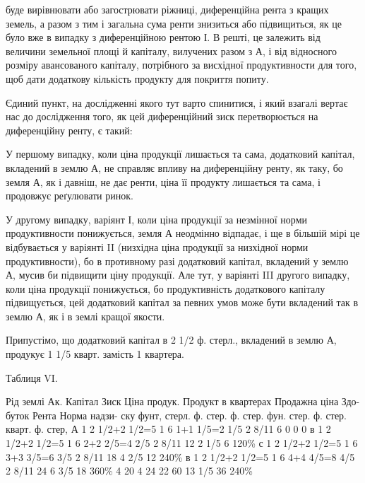 \parcont{}  %
буде вирівнювати або загострювати ріжниці, диференційна рента з кращих земель,
а разом з тим і загальна сума ренти знизиться або підвищиться, як це було
вже в випадку з диференційною рентою І. В решті, це залежить від величини земельної
площі й капіталу, вилучених разом з А, і від відносного розміру авансованого
капіталу, потрібного за висхідної продуктивности для того, щоб дати
додаткову кількість продукту для покриття попиту.

Єдиний пункт, на дослідженні якого тут варто спинитися, і який взагалі
вертає нас до дослідження того, як цей диференційний зиск перетворюється
на диференційну ренту, є такий:

У першому випадку, коли ціна продукції лишається та сама, додатковий
капітал, вкладений в землю А, не справляє впливу на диференційну ренту, як
таку, бо земля А, як і давніш, не дає ренти, ціна її продукту лишається та
сама, і продовжує реґулювати ринок.

У другому випадку, варіянт І, коли ціна продукції за незмінної норми продуктивности
понижується, земля А неодмінно відпадає, і ще в більшій мірі це
відбувається у варіянті II (низхідна ціна продукції за низхідної норми продуктивности),
бо в противному разі додатковий капітал, вкладений у землю А,
мусив би підвищити ціну продукції. Але тут, у варіянті III другого випадку,
коли ціна продукції понижується, бо продуктивність додаткового капіталу підвищується,
цей додатковий капітал за певних умов може бути вкладений так
в землю А, як і в землі кращої якости.

Припустімо, що додатковий капітал в 2 1/2 ф. стерл., вкладений в землю
А, продукує 1 1/5 кварт. замість 1 квартера.

Таблиця VI.

Рід  землі    Ак.    Капітал    Зиск    Ціна  продук.    Продукт в квартерах    Продажна  ціна    Здо-  буток    Рента        Норма  надзи-  ску
        фунт, стерл.    ф. стер.    ф. стер.        фун. стер.    ф. стер.    кварт.    ф. стер,    
А    1    2 1/2+2 1/2=5    1    6    1+1 1/5=2 1/5    2 8/11    6    0    0    0
в    1    2 1/2+2 1/2=5    1    6    2+2 2/5=4 2/5    2 8/11    12    2 1/5    6    120\%
с    1    2 1/2+2 1/2=5    1    6    3+3 3/5=6 3/5    2 8/11    18    4 2/5    12    240\%
в    1    2 1/2+2 1/2=5    1    6    4+4 4/5=8 4/5    2 8/11    24    6 3/5    18    360\%
    4    20    4    24    22        60    13 1/5    36    240\%

